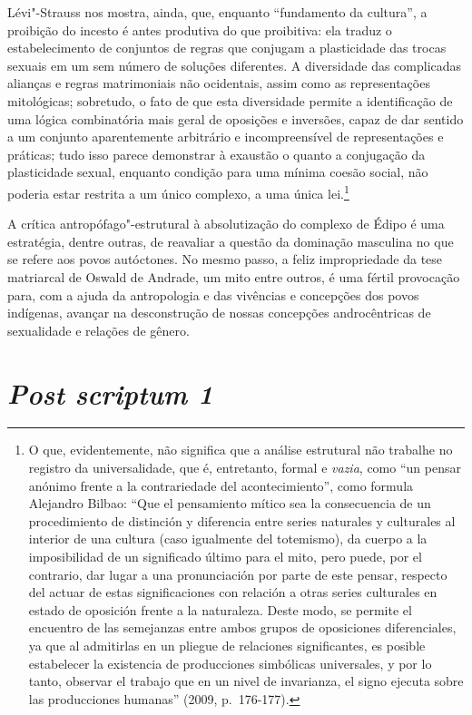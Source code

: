 Lévi"-Strauss nos mostra, ainda, que, enquanto ``fundamento da cultura'',
a proibição do incesto é antes produtiva do que proibitiva: ela traduz o
estabelecimento de conjuntos de regras que conjugam a plasticidade das
trocas sexuais em um sem número de soluções diferentes. A diversidade
das complicadas alianças e regras matrimoniais não ocidentais, assim
como as representações mitológicas; sobretudo, o fato de que esta
diversidade permite a identificação de uma lógica combinatória mais
geral de oposições e inversões, capaz de dar sentido a um conjunto
aparentemente arbitrário e incompreensível de representações e práticas;
tudo isso parece demonstrar à exaustão o quanto a conjugação da
plasticidade sexual, enquanto condição para uma mínima coesão social,
não poderia estar restrita a um único complexo, a uma única
lei.\footnote{O que, evidentemente, não significa que a análise
  estrutural não trabalhe no registro da universalidade, que é,
  entretanto, formal e \emph{vazia}, como ``un pensar anónimo frente a
  la contrariedade del acontecimiento'', como formula Alejandro Bilbao:
  ``Que el pensamiento mítico sea la consecuencia de un procedimiento de
  distinción y diferencia entre series naturales y culturales al
  interior de una cultura (caso igualmente del totemismo), da cuerpo a
  la imposibilidad de un significado último para el mito, pero puede,
  por el contrario, dar lugar a una pronunciación por parte de este
  pensar, respecto del actuar de estas significaciones con relación a
  otras series culturales en estado de oposición frente a la naturaleza.
  Deste modo, se permite el encuentro de las semejanzas entre ambos
  grupos de oposiciones diferenciales, ya que al admitirlas en un
  pliegue de relaciones significantes, es posible estabelecer la
  existencia de producciones simbólicas universales, y por lo tanto,
  observar el trabajo que en un nivel de invarianza, el signo ejecuta
  sobre las producciones humanas'' (2009, p.~176-177).}

A crítica antropófago"-estrutural à absolutização do complexo de Édipo é
uma estratégia, dentre outras, de reavaliar a questão da dominação
masculina no que se refere aos povos autóctones. No mesmo passo, a feliz
impropriedade da tese matriarcal de Oswald de Andrade, um mito entre
outros, é uma fértil provocação para, com a ajuda da antropologia e das
vivências e concepções dos povos indígenas, avançar na desconstrução de
nossas concepções androcêntricas de sexualidade e relações de gênero.

\section{\emph{Post scriptum 1}}

